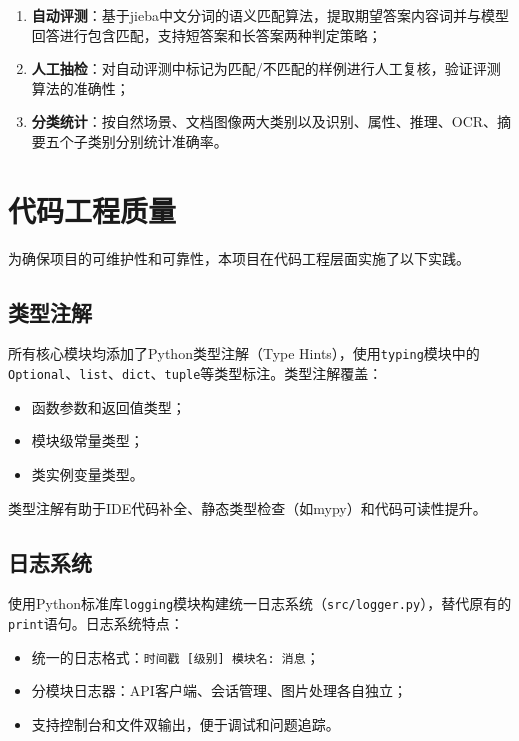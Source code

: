 \begin{enumerate}
  \item \textbf{自动评测}：基于jieba中文分词的语义匹配算法，提取期望答案内容词并与模型回答进行包含匹配，支持短答案和长答案两种判定策略；
  \item \textbf{人工抽检}：对自动评测中标记为匹配/不匹配的样例进行人工复核，验证评测算法的准确性；
  \item \textbf{分类统计}：按自然场景、文档图像两大类别以及识别、属性、推理、OCR、摘要五个子类别分别统计准确率。
\end{enumerate}

\section{代码工程质量}
\label{sec:code_quality}

为确保项目的可维护性和可靠性，本项目在代码工程层面实施了以下实践。

\subsection{类型注解}

所有核心模块均添加了Python类型注解（Type Hints），使用\texttt{typing}模块中的\texttt{Optional}、\texttt{list}、\texttt{dict}、\texttt{tuple}等类型标注。类型注解覆盖：

\begin{itemize}
  \item 函数参数和返回值类型；
  \item 模块级常量类型；
  \item 类实例变量类型。
\end{itemize}

类型注解有助于IDE代码补全、静态类型检查（如mypy）和代码可读性提升。

\subsection{日志系统}

使用Python标准库\texttt{logging}模块构建统一日志系统（\texttt{src/logger.py}），替代原有的\texttt{print}语句。日志系统特点：

\begin{itemize}
  \item 统一的日志格式：\texttt{时间戳 [级别] 模块名: 消息}；
  \item 分模块日志器：API客户端、会话管理、图片处理各自独立；
  \item 支持控制台和文件双输出，便于调试和问题追踪。
\end{itemize}


